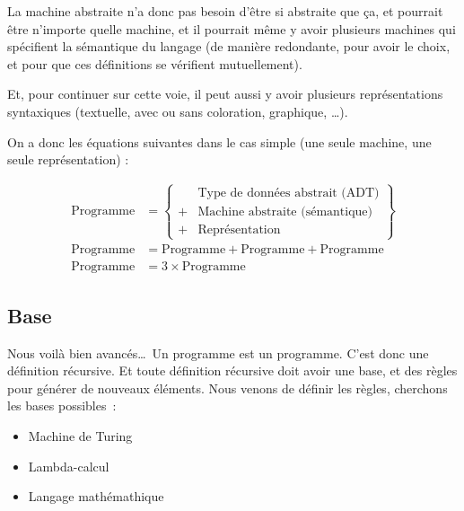 \documentclass{article}
\begin{document}
La machine abstraite n'a donc pas besoin d'être si abstraite que ça, et pourrait être n'importe quelle machine, et il pourrait même y avoir plusieurs machines qui spécifient la sémantique du langage (de manière redondante, pour avoir le choix, et pour que ces définitions se vérifient mutuellement).

Et, pour continuer sur cette voie, il peut aussi y avoir plusieurs représentations syntaxiques (textuelle, avec ou sans coloration, graphique, \dots).

On a donc les équations suivantes dans le cas simple (une seule machine, une seule représentation) :

\begin{align}
  \text{Programme} &= \left\lbrace
      \begin{array}{rl}
          &\text{Type de données abstrait (ADT)}\\
        + &\text{Machine abstraite (sémantique)}\\
        + &\text{Représentation}
      \end{array}
      \right\rbrace\\
  \text{Programme} &= \text{Programme} + \mathrm{Programme} + \mathrm{Programme}\\
  \text{Programme} &= 3 \times \text{Programme}
\end{align}

\subsection{Base}

Nous voilà bien avancés\dots\ Un programme est un programme. C'est donc une définition récursive. Et toute définition récursive doit avoir une base, et des règles pour générer de nouveaux éléments. Nous venons de définir les règles, cherchons les bases possibles~:
\begin{itemize}
\item Machine de Turing
\item Lambda-calcul
\item Langage mathémathique
\end{itemize}
\end{document}
